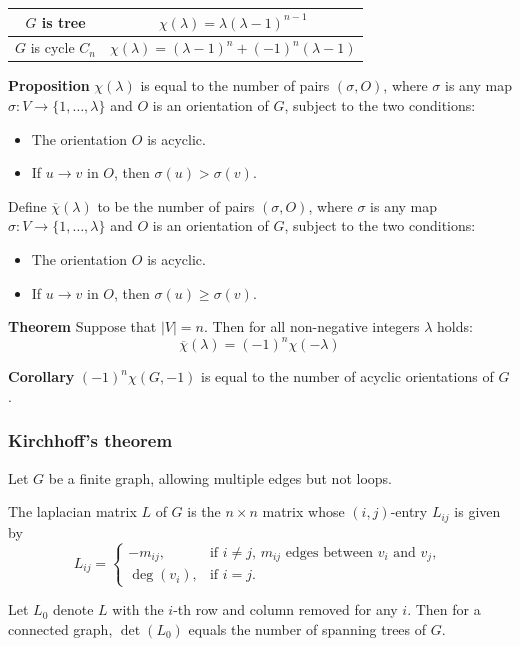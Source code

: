 \begin{tabular}{|c|c|}
\hline
$G$ is tree & $\chi(\lambda) = \lambda(\lambda - 1)^{n - 1}$ \\
\hline
$G$ is cycle $C_n$ & $\chi(\lambda) = (\lambda - 1)^n + (-1)^n(\lambda - 1)$\\
\hline
\end{tabular} 
 
\textbf{Proposition} $\chi(\lambda)$ is equal to the number of pairs $(\sigma, O)$, 
where $\sigma$ is any map $\sigma : V \rightarrow \{1, \dots, \lambda\}$ and $O$ is an orientation of $G$, 
subject to the two conditions:
\begin{itemize}
\item The orientation $O$ is acyclic.
\item If $u \rightarrow v$ in $O$, then $\sigma (u) > \sigma (v)$.
\end{itemize}

Define $\overline{\chi}(\lambda)$ to be the number of pairs $(\sigma, O)$, 
where $\sigma$ is any map $\sigma : V \rightarrow \{1, \dots, \lambda\}$ and $O$ is an orientation of $G$, 
subject to the two conditions:
\begin{itemize}
\item The orientation $O$ is acyclic.
\item If $u \rightarrow v$ in $O$, then $\sigma (u) \ge \sigma (v)$.
\end{itemize}

\textbf{Theorem} Suppose that $|V| = n$. Then for all non-negative integers $\lambda$ holds:
$$\overline{\chi}(\lambda) = (-1)^n \chi(-\lambda)$$

\textbf{Corollary} $(-1)^n \chi(G, -1)$ is equal to the number of acyclic orientations of $G$.

\vspace{10pt}

\subsubsection{Kirchhoff's theorem}

Let $G$ be a finite graph, allowing multiple edges but not loops.

The laplacian matrix $L$ of $G$ is the $n \times n$ matrix whose
$(i, j)$-entry $L_{i j}$ is given by
\begin{displaymath}
L_{i j} = \left\{ \begin{array}{ll}
-m_{i j}, & \textrm{if $i \ne j$, $m_{i j}$ edges between $v_i$ and $v_j$, } \\
\deg(v_i), & \textrm{if $i = j$.}
\end{array} \right.
\end{displaymath}

Let $L_0$ denote $L$ with the $i$-th row and column removed for any $i$.
Then for a connected graph, $\det(L_0)$ equals the number of spanning trees of $G$.
